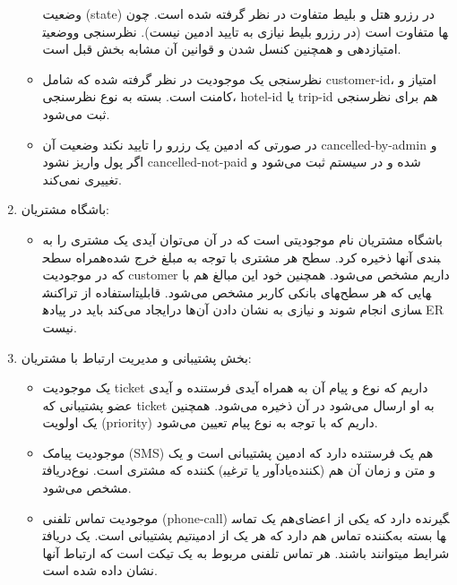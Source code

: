 \begin{enumerate}
\begin{itemize}
		وضعیت (state) در رزرو هتل و بلیط متفاوت در نظر گرفته شده‌ است. چون وضعیت‎ها متفاوت است (در رزرو بلیط نیازی به تایید ادمین نیست).
		نظرسنجی و امتیازدهی و همچنین کنسل شدن و قوانین آن مشابه بخش قبل است.
		\item 
		نظرسنجی یک موجودیت در نظر گرفته شده که شامل customer-id، امتیاز و کامنت است. بسته به نوع نظرسنجی، hotel-id یا trip-id هم برای نظرسنجی ثبت می‌شود.
		\item 
در صورتی که ادمین یک رزرو را تایید نکند وضعیت آن cancelled-by-admin و اگر پول واریز نشود cancelled-not-paid شده و در سیستم ثبت می‌شود و تغییری نمی‌کند.
	\end{itemize}
	\item باشگاه مشتریان:
	\begin{itemize}
		\item 
		باشگاه مشتریان نام موجودیتی است که در آن می‌توان آیدی یک مشتری را به همراه سطح‎بندی آنها ذخیره کرد. سطح هر مشتری با توجه به مبلغ خرج شده که در موجودیت customer داریم مشخص می‌شود. همچنین خود این مبالغ هم با استفاده از تراکنش‎های بانکی کاربر مشخص می‌شود.
		قابلیت‎هایی که هر سطح ایجاد می‌کند باید در پیاده‎سازی انجام شوند و نیازی به نشان دادن آن‌ها در ER نیست.
	\end{itemize}
	\item بخش پشتیبانی و مدیریت ارتباط با مشتریان:
	\begin{itemize}
		\item 
یک موجودیت ticket داریم که نوع و پیام آن به همراه آیدی فرستنده و آیدی عضو پشتیبانی که ticket به او ارسال می‌شود در آن ذخیره می‌شود. همچنین یک اولویت (priority) داریم که با توجه به نوع پیام تعیین می‌شود.
		\item 
موجودیت پیامک (SMS) هم یک فرستنده دارد که ادمین پشتیبانی است و یک دریافت‎کننده که مشتری است. نوع (یادآور یا ترغیب‎کننده) و متن و زمان آن هم مشخص می‌شود.
		\item 
موجودیت تماس تلفنی (phone-call) هم یک تماس‎گیرنده دارد که یکی از اعضای تیم پشتیبانی است. یک دریافت‎کننده تماس هم دارد که هر یک از ادمین‎ها بسته به شرایط میتوانند باشند. هر تماس تلفنی مربوط به یک تیکت است که ارتباط آنها نشان داده شده است.
	\end{itemize}
\end{enumerate}